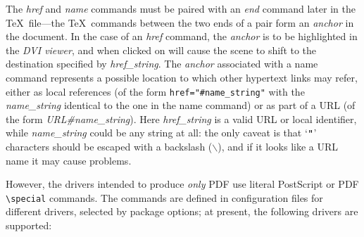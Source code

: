 \documentclass{article}
\begin{document}
The \emph{href} and \emph{name} commands must be paired with an
\emph{end} command later in the \TeX\ file---the \TeX\ commands between
the two ends of a pair form an \emph{anchor} in the document. In the
case of an \emph{href} command, the \emph{anchor} is to be highlighted
in the \emph{DVI viewer}, and when clicked on will cause the scene to
shift to the destination specified by \emph{href\_string}. The
\emph{anchor} associated with a name command represents a possible
location to which other hypertext links may refer, either as local
references (of the form \verb|href="#name_string"| with the
\emph{name\_string} identical to the one in the name command) or as part
of a URL (of the form \emph{URL\#name\_string}). Here
\emph{href\_string} is a valid URL or local identifier, while
\emph{name\_string} could be any string at all: the only caveat is that
`$\verb|"|$' characters should be escaped with a backslash
($\backslash$), and if it looks like a URL name it may cause problems.

However, the drivers intended to produce \emph{only} PDF use literal
PostScript or PDF \verb|\special| commands. The commands are defined in
configuration files for different drivers, selected by package options;
at present, the following drivers are supported:
\end{document}
